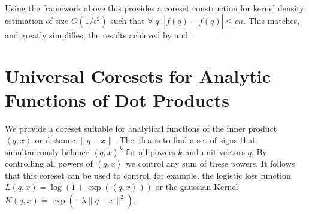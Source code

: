 \documentclass[anon,12pt]{colt2019} %
\newcommand{\zk}[1]{\textcolor{red}{ZK: #1}}
\newcommand{\el}[1]{\textcolor{blue}{EL: #1}}
\newcommand{\ip}[1]{\left \langle #1 \right \rangle}
\newcommand{\eps}{\epsilon}
\begin{document}
Using the framework above this provides a coreset construction for kernel density estimation of size $O(1/\eps^2)$ such that $\forall \;q\;\; |\tilde f(q) - f(q)| \le \eps n$. This matches, and greatly simplifies, the results achieved by \cite{DBLP:conf/soda/PhillipsT18} and \cite{DBLP:journals/corr/abs-1802-01751}.



\section{Universal Coresets for Analytic Functions of Dot Products}

We provide a coreset suitable for analytical functions of the inner product $\ip{q,x}$ or distance $\|q-x\|$. The idea is to find a set of signs that simultaneously balance $\ip{q,x}^k$ for all powers $k$ and unit vectors $q$. By controlling all powers of $\ip{q,x}$ we control any sum of these powers. It follows that this coreset can be used to control, for example, the logistic loss function $L(q,x) = \log(1+\exp(\ip{q,x}))$ or the gaussian Kernel $K(q,x) = \exp(-\lambda \|q-x\|^2)$. 
\end{document}
